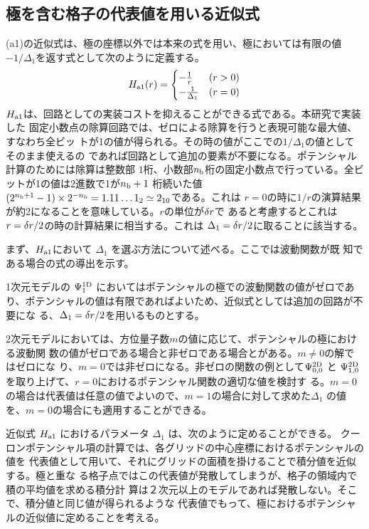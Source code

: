 \documentclass[fontsize=11pt]{jlreq}
\begin{document}
\subsection{極を含む格子の代表値を用いる近似式}
(a1)の近似式は、極の座標以外では本来の式を用い、極においては有限の値
$-1/\Delta_1$を返す式として次のように定義する。
\begin{equation}
H_{\mathrm{a1}}(r) = \begin{cases}
-\frac{1}{r} & (r>0) \\
-\frac{1}{\Delta_1} & (r=0)
\end{cases}\label{eq:Ha1r}
\end{equation}
$H_{\mathrm{a1}}$は、回路としての実装コストを抑えることができる式である。本研究で実装した
固定小数点の除算回路では、ゼロによる除算を行うと表現可能な最大値、すなわち全ビッ
トが1の値が得られる。その時の値がここでの$1/\Delta_1$の値としてそのまま使えるの
であれば回路として追加の要素が不要になる。ポテンシャル計算のためには除算は整数部
$1$桁、小数部$n_{\mathrm{b}}$桁の固定小数点で行っている。全ビットが1の値は2進数で1が$n_{\mathrm{b}}+1$
桁続いた値 $(2^{n_{\mathrm{b}}+1}-1)\times2^{-n_{\mathrm{b}}}=1.11\ldots1_2\simeq2_{10}$である。これは
$r=0$の時に$1/r$の演算結果が約2になることを意味している。$r$の単位が$\delta r$で
あると考慮するとこれは$r=\delta r/2$の時の計算結果に相当する。これは
$\Delta_1=\delta r/2$に取ることに該当する。

まず、$H_{\mathrm{a1}}$において $\Delta_1$ を選ぶ方法について述べる。ここでは波動関数が既
知である場合の式の導出を示す。

1次元モデルの $\Psi^{\mathrm{1D}}_1$ においてはポテンシャルの極での波動関数の値がゼロであ
り、ポテンシャルの値は有限であればよいため、近似式としては追加の回路が不要にな
る、$\Delta_1=\delta r/2$を用いるものとする。

2次元モデルにおいては、方位量子数$m$の値に応じて、ポテンシャルの極における波動関
数の値がゼロである場合と非ゼロである場合とがある。$m\ne0$の解ではゼロにな
り、$m=0$では非ゼロになる。非ゼロの関数の例として$\Psi^{\mathrm{2D}}_{0,0}$ と
$\Psi^{\mathrm{2D}}_{1,0}$を取り上げて、$r=0$におけるポテンシャル関数の適切な値を検討す
る。$m=0$の場合は代表値は任意の値でよいので、$m=1$の場合に対して求めた$\Delta_1$
の値を、$m=0$の場合にも適用することができる。

近似式 $H_{\mathrm{a1}}$ におけるパラメータ $\Delta_1$ は、次のように定めることができる。
クーロンポテンシャル項の計算では、各グリッドの中心座標におけるポテンシャルの値を
代表値として用いて、それにグリッドの面積を掛けることで積分値を近似する。極と重な
る格子点ではこの代表値が発散してしまうが、格子の領域内で積の平均値を求める積分計
算は２次元以上のモデルであれば発散しない。そこで、積分値と同じ値が得られるような
代表値でもって、極におけるポテンシャルの近似値に定めることを考える。
\end{document}

